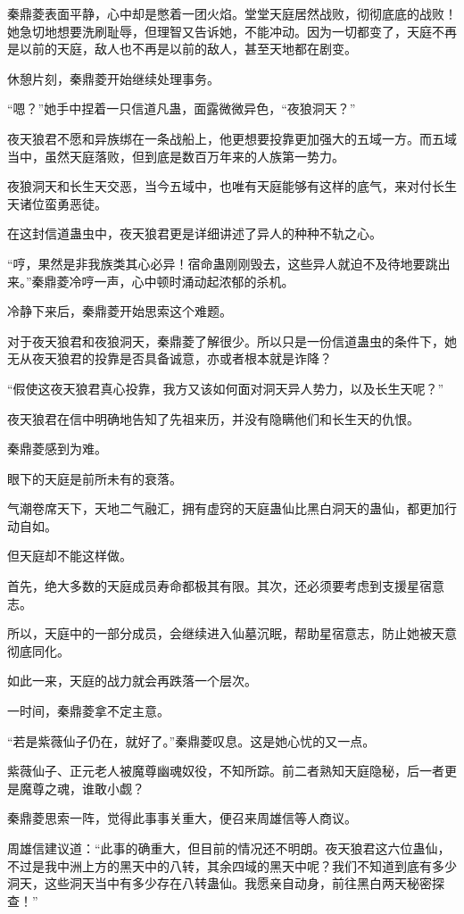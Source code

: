 \begin{this_body}
秦鼎菱表面平静，心中却是憋着一团火焰。堂堂天庭居然战败，彻彻底底的战败！她急切地想要洗刷耻辱，但理智又告诉她，不能冲动。因为一切都变了，天庭不再是以前的天庭，敌人也不再是以前的敌人，甚至天地都在剧变。

休憩片刻，秦鼎菱开始继续处理事务。

“嗯？”她手中捏着一只信道凡蛊，面露微微异色，“夜狼洞天？”

夜天狼君不愿和异族绑在一条战船上，他更想要投靠更加强大的五域一方。而五域当中，虽然天庭落败，但到底是数百万年来的人族第一势力。

夜狼洞天和长生天交恶，当今五域中，也唯有天庭能够有这样的底气，来对付长生天诸位蛮勇恶徒。

在这封信道蛊虫中，夜天狼君更是详细讲述了异人的种种不轨之心。

“哼，果然是非我族类其心必异！宿命蛊刚刚毁去，这些异人就迫不及待地要跳出来。”秦鼎菱冷哼一声，心中顿时涌动起浓郁的杀机。

冷静下来后，秦鼎菱开始思索这个难题。

对于夜天狼君和夜狼洞天，秦鼎菱了解很少。所以只是一份信道蛊虫的条件下，她无从夜天狼君的投靠是否具备诚意，亦或者根本就是诈降？

“假使这夜天狼君真心投靠，我方又该如何面对洞天异人势力，以及长生天呢？”

夜天狼君在信中明确地告知了先祖来历，并没有隐瞒他们和长生天的仇恨。

秦鼎菱感到为难。

眼下的天庭是前所未有的衰落。

气潮卷席天下，天地二气融汇，拥有虚窍的天庭蛊仙比黑白洞天的蛊仙，都更加行动自如。

但天庭却不能这样做。

首先，绝大多数的天庭成员寿命都极其有限。其次，还必须要考虑到支援星宿意志。

所以，天庭中的一部分成员，会继续进入仙墓沉眠，帮助星宿意志，防止她被天意彻底同化。

如此一来，天庭的战力就会再跌落一个层次。

一时间，秦鼎菱拿不定主意。

“若是紫薇仙子仍在，就好了。”秦鼎菱叹息。这是她心忧的又一点。

紫薇仙子、正元老人被魔尊幽魂奴役，不知所踪。前二者熟知天庭隐秘，后一者更是魔尊之魂，谁敢小觑？

秦鼎菱思索一阵，觉得此事事关重大，便召来周雄信等人商议。

周雄信建议道：“此事的确重大，但目前的情况还不明朗。夜天狼君这六位蛊仙，不过是我中洲上方的黑天中的八转，其余四域的黑天中呢？我们不知道到底有多少洞天，这些洞天当中有多少存在八转蛊仙。我愿亲自动身，前往黑白两天秘密探查！”


\end{this_body}
